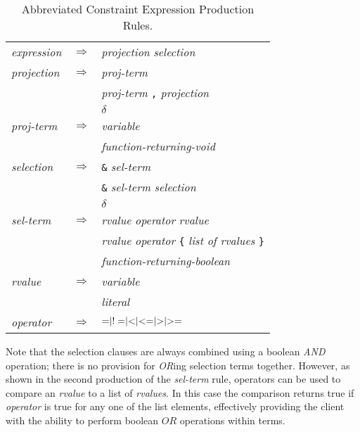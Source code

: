 \documentclass{article}
\begin{document}
\begin{table}
\caption{Abbreviated Constraint Expression Production Rules.}

\bigskip
\label{api:tab:expr}
\begin{center}
\begin{tabular}{lll} \hline

\emph{expression} & $\Rightarrow$ & \emph{projection} \emph{selection} \\

\emph{projection} & $\Rightarrow$ & \emph{proj-term} \\
                  &             & \emph{proj-term} {\tt ,} \emph{projection} \\
                  &             & $\delta$ \\

\emph{proj-term}  & $\Rightarrow$ & \emph{variable} \\
                  &             & \emph{function-returning-void}\\

\emph{selection}  & $\Rightarrow$ & {\tt \&} \emph{sel-term} \\
                  &             & {\tt \&} \emph{sel-term} \emph{selection} \\
                  &             & $\delta$ \\

\emph{sel-term}   & $\Rightarrow$ & \emph{rvalue} \emph{operator} \emph{rvalue} \\
                  &             & \emph{rvalue} \emph{operator} {\tt \{} 
                                         \emph{list of rvalues} {\tt \}} \\
                  &             & \emph{function-returning-boolean} \\

\emph{rvalue}     & $\Rightarrow$ & \emph{variable} \\
                  &             & \emph{literal} \\

\emph{operator}   & $\Rightarrow$ & ${\tt =} | {\tt !=} | {\tt <} | {\tt <=}
                                     | {\tt >} | {\tt >=}$ \\
\end{tabular}
\end{center}
\end{table}

Note that the selection clauses are always combined using a boolean \emph{AND}
operation; there is no provision for \emph{OR}ing selection terms together.
However, as shown in the second production of the \emph{sel-term} rule,
operators can be used to compare an \emph{rvalue} to a list of
\emph{rvalues}. In this case the comparison returns true if \emph{operator}
is true for any one of the list elements, effectively providing the client
with the ability to perform boolean $OR$ operations within terms.

\raggedright

\newpage

\end{document}
